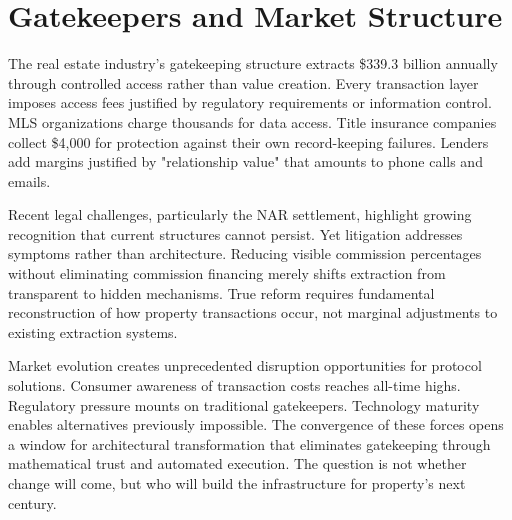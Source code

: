 \section{Gatekeepers and Market Structure}

The real estate industry's gatekeeping structure extracts \$339.3 billion annually through controlled access rather than value creation. Every transaction layer imposes access fees justified by regulatory requirements or information control. MLS organizations charge thousands for data access. Title insurance companies collect \$4{,}000 for protection against their own record-keeping failures. Lenders add margins justified by "relationship value" that amounts to phone calls and emails.

Recent legal challenges, particularly the NAR settlement, highlight growing recognition that current structures cannot persist. Yet litigation addresses symptoms rather than architecture. Reducing visible commission percentages without eliminating commission financing merely shifts extraction from transparent to hidden mechanisms. True reform requires fundamental reconstruction of how property transactions occur, not marginal adjustments to existing extraction systems.

Market evolution creates unprecedented disruption opportunities for protocol solutions. Consumer awareness of transaction costs reaches all-time highs. Regulatory pressure mounts on traditional gatekeepers. Technology maturity enables alternatives previously impossible. The convergence of these forces opens a window for architectural transformation that eliminates gatekeeping through mathematical trust and automated execution. The question is not whether change will come, but who will build the infrastructure for property's next century.